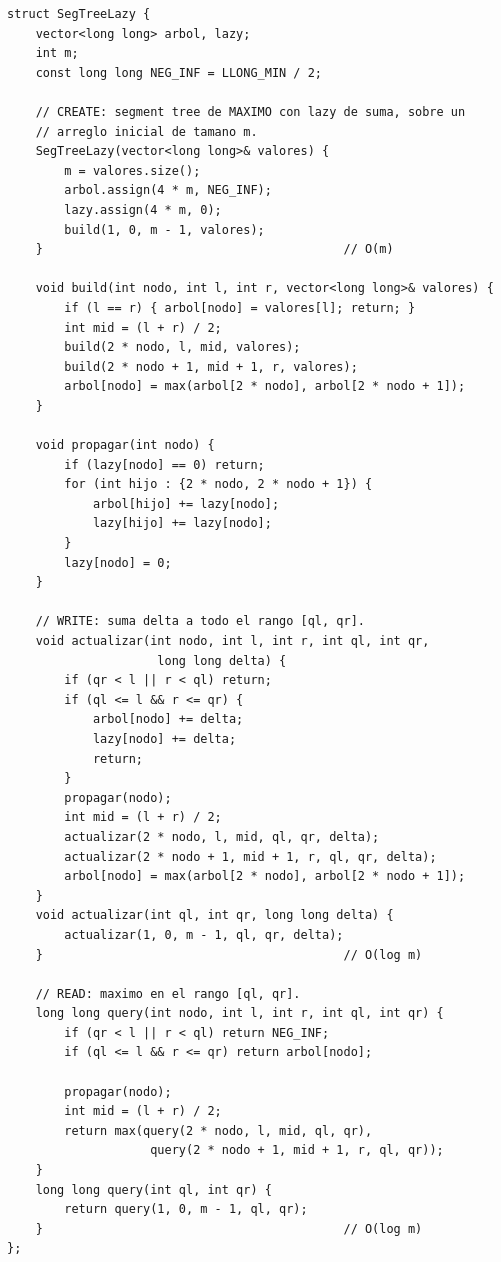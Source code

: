 \documentclass[10pt,a4paper,twocolumn]{article}
\begin{document}
\begin{lstlisting}[style=cpp]
struct SegTreeLazy {
    vector<long long> arbol, lazy;
    int m;
    const long long NEG_INF = LLONG_MIN / 2;

    // CREATE: segment tree de MAXIMO con lazy de suma, sobre un
    // arreglo inicial de tamano m.
    SegTreeLazy(vector<long long>& valores) {
        m = valores.size();
        arbol.assign(4 * m, NEG_INF);
        lazy.assign(4 * m, 0);
        build(1, 0, m - 1, valores);
    }                                          // O(m)

    void build(int nodo, int l, int r, vector<long long>& valores) {
        if (l == r) { arbol[nodo] = valores[l]; return; }
        int mid = (l + r) / 2;
        build(2 * nodo, l, mid, valores);
        build(2 * nodo + 1, mid + 1, r, valores);
        arbol[nodo] = max(arbol[2 * nodo], arbol[2 * nodo + 1]);
    }

    void propagar(int nodo) {
        if (lazy[nodo] == 0) return;
        for (int hijo : {2 * nodo, 2 * nodo + 1}) {
            arbol[hijo] += lazy[nodo];
            lazy[hijo] += lazy[nodo];
        }
        lazy[nodo] = 0;
    }

    // WRITE: suma delta a todo el rango [ql, qr].
    void actualizar(int nodo, int l, int r, int ql, int qr,
                     long long delta) {
        if (qr < l || r < ql) return;
        if (ql <= l && r <= qr) {
            arbol[nodo] += delta;
            lazy[nodo] += delta;
            return;
        }
        propagar(nodo);
        int mid = (l + r) / 2;
        actualizar(2 * nodo, l, mid, ql, qr, delta);
        actualizar(2 * nodo + 1, mid + 1, r, ql, qr, delta);
        arbol[nodo] = max(arbol[2 * nodo], arbol[2 * nodo + 1]);
    }
    void actualizar(int ql, int qr, long long delta) {
        actualizar(1, 0, m - 1, ql, qr, delta);
    }                                          // O(log m)

    // READ: maximo en el rango [ql, qr].
    long long query(int nodo, int l, int r, int ql, int qr) {
        if (qr < l || r < ql) return NEG_INF;
        if (ql <= l && r <= qr) return arbol[nodo];

        propagar(nodo);
        int mid = (l + r) / 2;
        return max(query(2 * nodo, l, mid, ql, qr),
                    query(2 * nodo + 1, mid + 1, r, ql, qr));
    }
    long long query(int ql, int qr) {
        return query(1, 0, m - 1, ql, qr);
    }                                          // O(log m)
};


\end{lstlisting}
\end{document}
